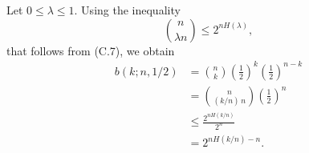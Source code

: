 \starred
Let $0\le\lambda\le1$.
Using the inequality
\[
    \binom{n}{\lambda n} \le 2^{nH(\lambda)},
\]
that follows from (C.7), we obtain
\begin{align*}
    b(k;n,1/2) &= \binom{n}{k}\left(\frac{1}{2}\right)^k\left(\frac{1}{2}\right)^{n-k} \\
    &= \binom{n}{(k/n)\,n}\left(\frac{1}{2}\right)^n \\
    &\le \frac{2^{nH(k/n)}}{2^n} \\[1mm]
    &= 2^{nH(k/n)-n}.
\end{align*}
